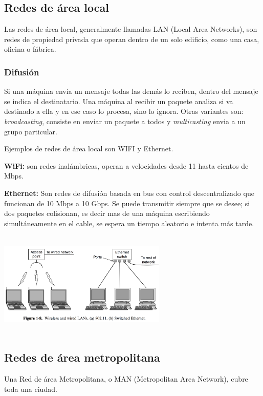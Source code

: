 \documentclass[10pt,a4paper]{report}
\begin{document}
\subsection{Redes de área local}
\par Las redes de área local, generalmente llamadas LAN (Local Area Networks), son 
redes de propiedad privada que operan dentro de un solo edificio, como una casa, 
oficina o fábrica.
\subsubsection{Difusión}
\par Si una máquina envía un mensaje todas las demás lo reciben, dentro del mensaje se indica el destinatario. Una máquina al recibir un paquete analiza si va destinado a ella y en ese caso lo procesa, sino lo ignora. Otras variantes son: \textit{broadcasting}, consiste en enviar un paquete a todos y \textit{multicasting} envia a un grupo particular.
\par Ejemplos de redes de área local son WIFI y Ethernet.

\par \textbf{WiFi:} son redes inalámbricas, operan a velocidades desde 11 hasta cientos de Mbps.

\par \textbf{Ethernet:} Son redes de difusión basada en bus con control descentralizado que funcionan de 10 Mbps a 10 Gbps. Se puede transmitir siempre que se desee; si dos paquetes colisionan, es decir mas de una máquina escribiendo simultáneamente en el cable, se espera un tiempo aleatorio e intenta más tarde.

\begin{center} 
	\includegraphics[width=8cm, height=5cm]{./imagenes/arealocal.png} 
\end{center}

\subsection{Redes de área metropolitana}
\par Una Red de área Metropolitana, o MAN (Metropolitan Area Network), cubre toda 
una ciudad.
\end{document}
